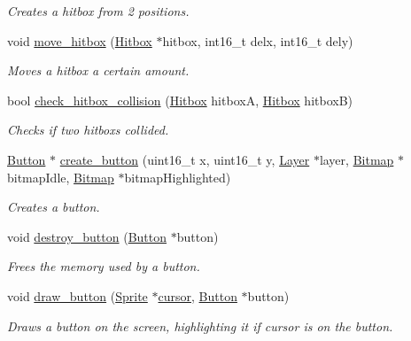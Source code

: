 \begin{DoxyCompactItemize}
\begin{DoxyCompactList}\small\item\em Creates a hitbox from 2 positions. \end{DoxyCompactList}\item 
void \mbox{\hyperlink{group__sprite_ga71d979b14726234dc84191b6e5534b5e}{move\+\_\+hitbox}} (\mbox{\hyperlink{struct_hitbox}{Hitbox}} $\ast$hitbox, int16\+\_\+t delx, int16\+\_\+t dely)
\begin{DoxyCompactList}\small\item\em Moves a hitbox a certain amount. \end{DoxyCompactList}\item 
bool \mbox{\hyperlink{group__sprite_gace4cfe7bbf61f89e7342615ed1dccf56}{check\+\_\+hitbox\+\_\+collision}} (\mbox{\hyperlink{struct_hitbox}{Hitbox}} hitboxA, \mbox{\hyperlink{struct_hitbox}{Hitbox}} hitboxB)
\begin{DoxyCompactList}\small\item\em Checks if two hitboxs collided. \end{DoxyCompactList}\item 
\mbox{\hyperlink{struct_button}{Button}} $\ast$ \mbox{\hyperlink{group__sprite_gae13b75db5ceecfd2fc00a030910c8e7a}{create\+\_\+button}} (uint16\+\_\+t x, uint16\+\_\+t y, \mbox{\hyperlink{struct_layer}{Layer}} $\ast$layer, \mbox{\hyperlink{struct_bitmap}{Bitmap}} $\ast$bitmap\+Idle, \mbox{\hyperlink{struct_bitmap}{Bitmap}} $\ast$bitmap\+Highlighted)
\begin{DoxyCompactList}\small\item\em Creates a button. \end{DoxyCompactList}\item 
void \mbox{\hyperlink{group__sprite_ga6b75c612ee123b9b3261a831fd6d805b}{destroy\+\_\+button}} (\mbox{\hyperlink{struct_button}{Button}} $\ast$button)
\begin{DoxyCompactList}\small\item\em Frees the memory used by a button. \end{DoxyCompactList}\item 
void \mbox{\hyperlink{group__sprite_ga39cf20a4f80d3e42f7ecc3dab4bd7b65}{draw\+\_\+button}} (\mbox{\hyperlink{struct_sprite}{Sprite}} $\ast$\mbox{\hyperlink{pengoo_8c_a3a7ea4305773abf5347bb261a8a5c16b}{cursor}}, \mbox{\hyperlink{struct_button}{Button}} $\ast$button)
\begin{DoxyCompactList}\small\item\em Draws a button on the screen, highlighting it if cursor is on the button. \end{DoxyCompactList}\item 

\end{DoxyCompactItemize}
